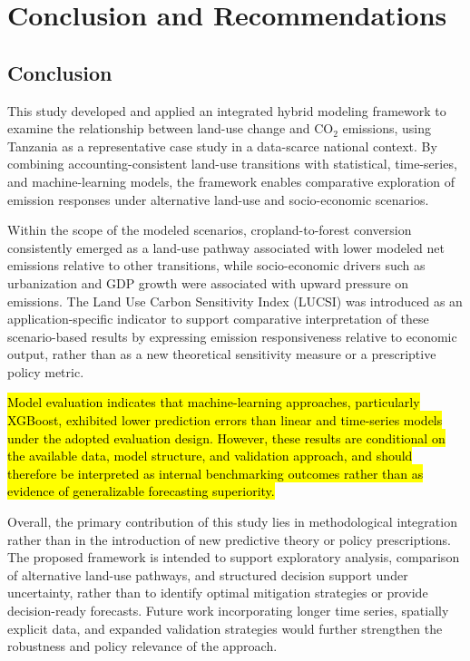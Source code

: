 \documentclass[10pt,letterpaper]{article}
\begin{document}
\section{Conclusion and Recommendations}
\label{sec:conclusion}

\subsection{Conclusion}

This study developed and applied an integrated hybrid modeling framework to examine the relationship between land-use change and CO$_2$ emissions, using Tanzania as a representative case study in a data-scarce national context. By combining accounting-consistent land-use transitions with statistical, time-series, and machine-learning models, the framework enables comparative exploration of emission responses under alternative land-use and socio-economic scenarios.

Within the scope of the modeled scenarios, cropland-to-forest conversion consistently emerged as a land-use pathway associated with lower modeled net emissions relative to other transitions, while socio-economic drivers such as urbanization and GDP growth were associated with upward pressure on emissions. The Land Use Carbon Sensitivity Index (LUCSI) was introduced as an application-specific indicator to support comparative interpretation of these scenario-based results by expressing emission responsiveness relative to economic output, rather than as a new theoretical sensitivity measure or a prescriptive policy metric.

\hl{Model evaluation indicates that machine-learning approaches, particularly XGBoost, exhibited lower prediction errors than linear and time-series models under the adopted evaluation design. However, these results are conditional on the available data, model structure, and validation approach, and should therefore be interpreted as internal benchmarking outcomes rather than as evidence of generalizable forecasting superiority.}

Overall, the primary contribution of this study lies in methodological integration rather than in the introduction of new predictive theory or policy prescriptions. The proposed framework is intended to support exploratory analysis, comparison of alternative land-use pathways, and structured decision support under uncertainty, rather than to identify optimal mitigation strategies or provide decision-ready forecasts. Future work incorporating longer time series, spatially explicit data, and expanded validation strategies would further strengthen the robustness and policy relevance of the approach.
\end{document}
